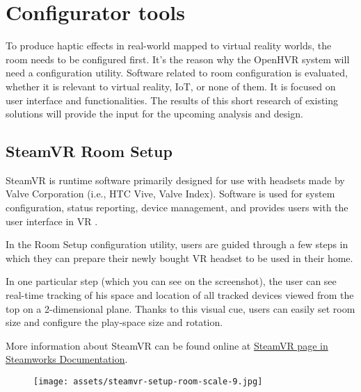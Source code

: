 \hypertarget{x-configurator-tools}{\section{Configurator tools}}
To produce haptic effects in real-world mapped to virtual reality worlds,
the room needs to be configured first.
It’s the reason why the OpenHVR system will need a configuration utility.
Software related to room configuration is evaluated, whether it is relevant
to virtual reality, IoT, or none of them. It is focused on user interface and functionalities.
The results of this short research of existing solutions
will provide the input for the upcoming analysis and design.


\hypertarget{x-steamvr-room-setup}{\subsection{SteamVR Room Setup}}
SteamVR is runtime software primarily designed for use with headsets made
by Valve Corporation (i.e., HTC Vive, Valve Index). Software is used for
system configuration, status reporting, device management, and provides users
with the user interface in VR \hyperlink{steamvr}{}.


In the Room Setup configuration utility, users are guided through a few steps
in which they can prepare their newly bought VR headset to be used in their
home.


In one particular step (which you can see on the screenshot), the user can see
real-time tracking of his space and location of all tracked devices viewed
from the top on a 2-dimensional plane. Thanks to this visual cue, users can
easily set room size and configure the play-space size and rotation.


More information about SteamVR can be found online at
\href{https://partner.steamgames.com/doc/features/steamvr/info}{SteamVR page in Steamworks Documentation}.


\begin{figure}[h]{}
\centering\texttt{[image: assets/steamvr-setup-room-scale-9.jpg]}
\caption{}

\end{figure}

